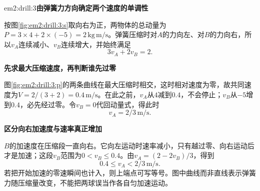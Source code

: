 \begin{drillsolution}{em2:drill:3}\textbf{由弹簧力方向确定两个速度的单调性}\par\nobreak
按图\ref{fig:em2:drill:3:s}取向右为正，两物体的总动量为$P=3\times4+2\times(-5)=2\,\mathrm{kg\,m/s}$。弹簧压缩时对$A$的力向左、对$B$的力向右，所以$v_A$连续减小、$v_B$连续增大，并始终满足
\[3v_A+2v_B=2.\]



\par\medskip{}\noindent\textbf{先求最大压缩速度，再判断谁先过零}\par\nobreak
图\ref{fig:em2:drill:3:p}的两条曲线在最大压缩时相交，这时相对速度为零，故共同速度为$V=2/(3+2)=0.4\,\mathrm{m/s}$。在此之前，$v_A$从$4$减到$0.4$，不会停止；$v_B$从$-5$增到$0.4$，必先经过零。令$v_B=0$代回动量式，得此时
\[\boxed{v_A=2/3\,\mathrm{m/s}}.\]



\par\medskip{}\noindent\textbf{区分向右加速度与速率真正增加}\par\nobreak
$B$的加速度在压缩段一直向右。它向左运动时速率减小，只有越过零、向右运动后才是加速；这段$v_B$范围为$0<v_B\le0.4$。由$v_A=(2-2v_B)/3$，得到
\[\boxed{0.4\le v_A<2/3\,\mathrm{m/s}}.\]
若把开始加速的零速瞬间也计入，则上端点可写等号。图中曲线而非直线表示弹簧力随压缩量改变，不能把两球误当作各自匀加速运动。\end{drillsolution}
